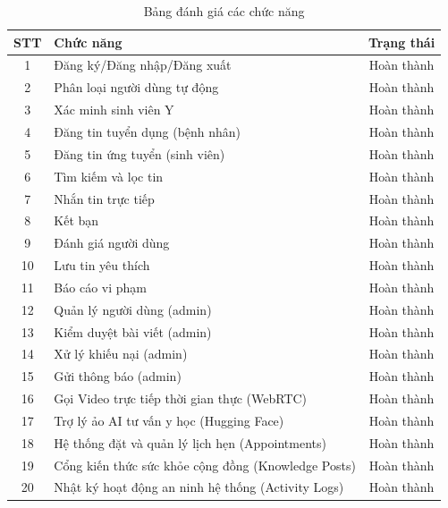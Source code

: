 \documentclass[a4paper,13pt]{extreport}
\begin{document}
\begin{table}[H]
\centering
\caption{Bảng đánh giá các chức năng}
\begin{tabular}{|c|l|c|}
\hline
\textbf{STT} & \textbf{Chức năng} & \textbf{Trạng thái} \\
\hline
1 & Đăng ký/Đăng nhập/Đăng xuất & Hoàn thành \\
2 & Phân loại người dùng tự động & Hoàn thành \\
3 & Xác minh sinh viên Y & Hoàn thành \\
4 & Đăng tin tuyển dụng (bệnh nhân) & Hoàn thành \\
5 & Đăng tin ứng tuyển (sinh viên) & Hoàn thành \\
6 & Tìm kiếm và lọc tin & Hoàn thành \\
7 & Nhắn tin trực tiếp & Hoàn thành \\
8 & Kết bạn & Hoàn thành \\
9 & Đánh giá người dùng & Hoàn thành \\
10 & Lưu tin yêu thích & Hoàn thành \\
11 & Báo cáo vi phạm & Hoàn thành \\
12 & Quản lý người dùng (admin) & Hoàn thành \\
13 & Kiểm duyệt bài viết (admin) & Hoàn thành \\
14 & Xử lý khiếu nại (admin) & Hoàn thành \\
15 & Gửi thông báo (admin) & Hoàn thành \\
16 & Gọi Video trực tiếp thời gian thực (WebRTC) & Hoàn thành \\
17 & Trợ lý ảo AI tư vấn y học (Hugging Face) & Hoàn thành \\
18 & Hệ thống đặt và quản lý lịch hẹn (Appointments) & Hoàn thành \\
19 & Cổng kiến thức sức khỏe cộng đồng (Knowledge Posts) & Hoàn thành \\
20 & Nhật ký hoạt động an ninh hệ thống (Activity Logs) & Hoàn thành \\
\hline
\end{tabular}
\end{table}
\end{document}
